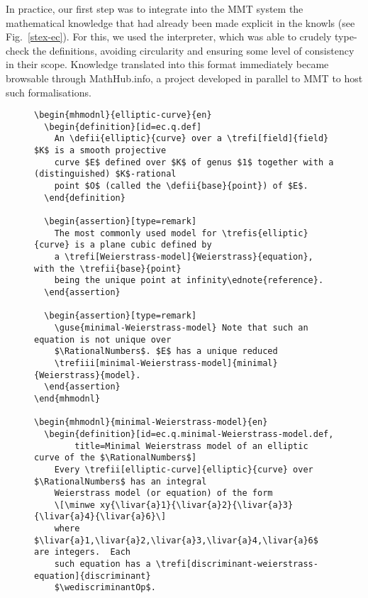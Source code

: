 In practice, our first step was to integrate into the MMT system the mathematical knowledge that had already been made explicit in the knowls (see Fig.~\ref{stex-ec}). For this, we used the \stex interpreter, which was able to crudely type-check the definitions, avoiding circularity and ensuring some level of consistency in their scope. Knowledge translated into this format immediately became browsable through \textsf{MathHub.info}, a project developed in parallel to MMT to host such formalisations. 

\begin{figure}
\begin{lstlisting}[language={[sTeX]TeX}]
\begin{mhmodnl}{elliptic-curve}{en}
  \begin{definition}[id=ec.q.def]
    An \defii{elliptic}{curve} over a \trefi[field]{field} $K$ is a smooth projective
    curve $E$ defined over $K$ of genus $1$ together with a (distinguished) $K$-rational 
    point $O$ (called the \defii{base}{point}) of $E$.
  \end{definition}
  
  \begin{assertion}[type=remark]
    The most commonly used model for \trefis{elliptic}{curve} is a plane cubic defined by
    a \trefi[Weierstrass-model]{Weierstrass}{equation}, with the \trefii{base}{point}
    being the unique point at infinity\ednote{reference}.
  \end{assertion}
  
  \begin{assertion}[type=remark]
    \guse{minimal-Weierstrass-model} Note that such an equation is not unique over
    $\RationalNumbers$. $E$ has a unique reduced
    \trefiii[minimal-Weierstrass-model]{minimal}{Weierstrass}{model}.
  \end{assertion}
\end{mhmodnl}

\begin{mhmodnl}{minimal-Weierstrass-model}{en}
  \begin{definition}[id=ec.q.minimal-Weierstrass-model.def, 
  		title=Minimal Weierstrass model of an elliptic curve of the $\RationalNumbers$]
    Every \trefii[elliptic-curve]{elliptic}{curve} over $\RationalNumbers$ has an integral
    Weierstrass model (or equation) of the form
    \[\minwe xy{\livar{a}1}{\livar{a}2}{\livar{a}3}{\livar{a}4}{\livar{a}6}\]
    where $\livar{a}1,\livar{a}2,\livar{a}3,\livar{a}4,\livar{a}6$ are integers.  Each
    such equation has a \trefi[discriminant-weierstrass-equation]{discriminant}
    $\wediscriminantOp$.


\end{lstlisting}
\end{figure}
